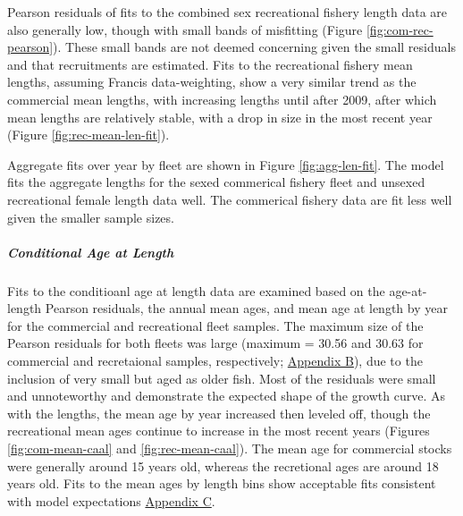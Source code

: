 \documentclass[11pt,
  english,
  a4paper,
]{article}
\begin{document}
\leavevmode\tagmcend\tagstructend\par


Pearson residuals of fits to the combined sex recreational fishery length data are also generally low, though with small bands of misfitting (Figure \ref{fig:com-rec-pearson}). These small bands are not deemed concerning given the small residuals and that recruitments are estimated. Fits to the recreational fishery mean lengths, assuming Francis data-weighting, show a very similar trend as the commercial mean lengths, with increasing lengths until after 2009, after which mean lengths are relatively stable, with a drop in size in the most recent year (Figure \ref{fig:rec-mean-len-fit}).

\leavevmode\tagmcend\tagstructend\par


Aggregate fits over year by fleet are shown in Figure \ref{fig:agg-len-fit}. The model fits the aggregate lengths for the sexed commerical fishery fleet and unsexed recreational female length data well. The commerical fishery data are fit less well given the smaller sample sizes.

\leavevmode\tagmcend\tagstructend\par


\hypertarget{conditional-age-at-length}{%
\subparagraph{Conditional Age at Length}\label{conditional-age-at-length}}

\leavevmode\tagmcend\tagstructend


Fits to the conditioanl age at length data are examined based on the age-at-length Pearson residuals, the annual mean ages, and mean age at length by year for the commercial and recreational fleet samples. The maximum size of the Pearson residuals for both fleets was large (maximum = 30.56 and 30.63 for commercial and recretaional samples, respectively; {\protect\hyperlink{app_b}{Appendix B}\leavevmode\tagmcend\tagstructend}), due to the inclusion of very small but aged as older fish. Most of the residuals were small and unnoteworthy and demonstrate the expected shape of the growth curve. As with the lengths, the mean age by year increased then leveled off, though the recreational mean ages continue to increase in the most recent years (Figures \ref{fig:com-mean-caal} and \ref{fig:rec-mean-caal}). The mean age for commercial stocks were generally around 15 years old, whereas the recretional ages are around 18 years old. Fits to the mean ages by length bins show acceptable fits consistent with model expectations {\protect\hyperlink{app_c}{Appendix C}\leavevmode\tagmcend\tagstructend}.
\end{document}

